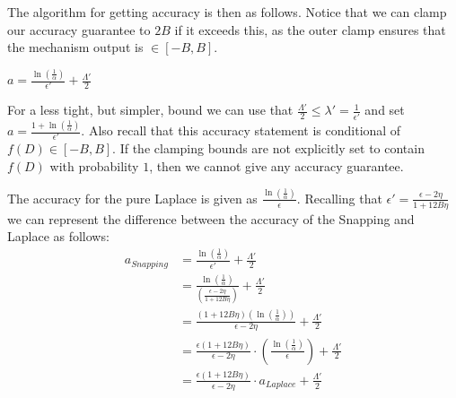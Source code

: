 \documentclass[11pt]{scrartcl} %
\begin{document}
The algorithm for getting accuracy is then as follows. Notice that we can clamp our accuracy guarantee to $2B$ if it
exceeds this, as the outer clamp ensures that the mechanism output is $\in [-B, B]$.
\begin{algorithm}
	\label{GetAccuracy2}
	\begin{algorithmic}
			\State $a = \frac{\ln \left( \frac{1}{\alpha} \right)}{\epsilon'} + \frac{\Lambda'}{2}$
					\State{}
			\Else{}
				\State{}
			\EndIf
		\EndFunction
	\end{algorithmic}
\end{algorithm}

For a less tight, but simpler, bound we can use that $\frac{\Lambda'}{2} \leq \lambda' =
\frac{1}{\epsilon'}$ and set $a = \frac{1 + \ln \left( \frac{1}{\alpha} \right)}{\epsilon'}$.
Also recall that this accuracy statement is conditional of $f(D) \in [-B, B]$. If the clamping bounds are not
explicitly set to contain $f(D)$ with probability $1$, then we cannot give any accuracy guarantee. \newline

The accuracy for the pure Laplace is given as $\frac{\ln \left( \frac{1}{\alpha} \right)}{\epsilon}$. Recalling that
$\epsilon' = \frac{\epsilon - 2\eta}{1 + 12B\eta}$ we can represent the difference between the accuracy of the
Snapping and Laplace as follows:
\begin{align*}
	a_{Snapping} &= \frac{\ln \left( \frac{1}{\alpha} \right)}{\epsilon'} + \frac{\Lambda'}{2} \\
	&= \frac{\ln \left( \frac{1}{\alpha} \right)}{\left( \frac{\epsilon - 2\eta}{1 + 12B\eta} \right)} + \frac{\Lambda'}{2} \\
	&= \frac{(1 + 12B \eta) \left(\ln \left( \frac{1}{\alpha} \right) \right)}{\epsilon - 2\eta} + \frac{\Lambda'}{2} \\
	&= \frac{\epsilon(1 + 12B \eta)}{\epsilon - 2\eta } \cdot \left(\frac{\ln \left( \frac{1}{\alpha} \right)}{\epsilon} \right) + \frac{\Lambda'}{2} \\
	&= \frac{\epsilon(1 + 12B \eta)}{\epsilon - 2\eta} \cdot a_{Laplace} + \frac{\Lambda'}{2}
\end{align*}
\end{document}
